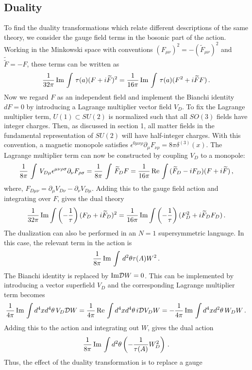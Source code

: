 \subsection{Duality}
To find the duality transformations which relate different
descriptions of the same theory, we consider the gauge field terms in
the bosonic part of the action. Working in the Minkowski space with
conventions $(F_{\mu\nu})^2=-(\widetilde F_{\mu \nu})^2$ and
$\widetilde{\widetilde F}=-F$, these
terms can be written as 
$$
\frac{1}{32 \pi} \, {\rm Im}\, \int \, \tau (a) (F+i\widetilde F)^2 =
\frac{1}{16 \pi} \, {\rm Im} \, \int \, \tau (a) (F^{2}+i\widetilde
FF) \,.
$$
Now we regard $F$ as an independent field and implement the Bianchi 
identity $dF = 0$ by introducing a Lagrange multiplier vector field
$V_{D}$. To fix the Lagrange multiplier term, $U(1)\subset SU(2)$ is
normalized such that all $SO(3)$ fields have integer charges. Then, as
discussed in section 1, all matter fields in the fundamental
representation of $SU(2)$ will have half-integer charges. With this 
convention, a magnetic monopole satisfies $\epsilon^{0\mu\nu\rho}
\partial_{\mu}F_{\nu\rho}=8\pi\delta^{(3)}(x)$. The Lagrange
multiplier term can now be constructed by coupling $V_D$ to a
monopole:
$$
\frac{1}{8\pi}\,\int\,V_{D \mu}\epsilon^{\mu\nu\rho\sigma}
\partial_{\nu}F_{\rho\sigma}=\frac{1}{8\pi}\,\int\,\widetilde F_{D}F = 
\frac{1}{16\pi}\,{\rm Re}\,\int\,(\widetilde
F_{D}-iF_{D})(F+i\widetilde F)\,,
$$
where, $F_{D\mu\nu}=\partial_\mu V_{D\nu}-\partial_\nu V_{D\mu}$. 
Adding this to the gauge field action and integrating over $F$,
gives the dual theory
$$
\frac{1}{32\pi}\,{\rm Im}\int \left(-\frac{1}{\tau}\right)
(F_D +i\widetilde F_D)^2=\frac{1}{16\pi}\,{\rm Im}\int\left(-\frac{1}{\tau}
\right) (F_D^2 +i\widetilde F_D F_D)\,.
$$
The dualization can also be performed in an $N=1$ supersymmetric
language. In this case, the relevant term in the action is 
$$
\frac{1}{8 \pi} \, {\rm Im} \, \int \, d^{2}\theta
\tau (A) W^{2}\,.
$$
The Bianchi identity is replaced by ${\rm Im}{\cal D}W = 0$. This can
be implemented by introducing a vector superfield $V_{D}$ and the
corresponding Lagrange multiplier term becomes
$$
\frac{1}{4\pi}\,{\rm Im}\,\int d^4x d^4\theta\, V_{D}{\cal D}W 
=\frac{1}{4 \pi}\,{\rm Re}\,\int d^4x d^4\theta\, i{\cal D}V_D W
=-\frac{1}{4\pi}\,{\rm Im}\,\int d^4x d^2\theta\, W_{D} W\,.
$$
Adding this to the action and integrating out $W$, gives the dual
action 
$$
\frac{1}{8\pi}\,{\rm Im}\,\int d^2\theta \left(-\frac{1}{\tau(A)}
W^2_D \right)\,. 
$$
Thus, the effect of the duality transformation is to replace a gauge
